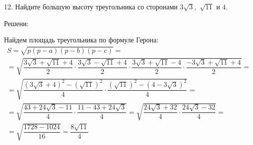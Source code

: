 12. Найдите большую высоту треугольника со сторонами $3\sqrt{3},$ $\sqrt{11}$ и $4$.

Решени:

Найдем площадь треугольника по формуле Герона:
\begin{multline*}
S = \sqrt{p(p-a)(p-b)(p-c)} =\\
=\sqrt{\dfrac{3\sqrt{3}+\sqrt{11}+4}{2}\cdot \dfrac{3\sqrt{3}-\sqrt{11}+4}{2}\cdot \dfrac{3\sqrt{3}+\sqrt{11}-4}{2}\cdot \dfrac{-3\sqrt{3}+\sqrt{11}+4}{2}}=\\
=\sqrt{\dfrac{(3\sqrt{3}+4)^2-(\sqrt{11})^2}{4}\cdot \dfrac{(\sqrt{11})^2-(4-3\sqrt{3})^2}{4}}=\\
=\sqrt{\dfrac{43+24\sqrt{3}-11}{4}\cdot \dfrac{11-43+24\sqrt{3}}{4}} =\sqrt{\dfrac{24\sqrt{3}+32}{4}\cdot \dfrac{24\sqrt{3}-32}{4}} =\\= \sqrt{\dfrac{1728-1024}{16}} = \dfrac{8\sqrt{11}}{4}
\end{multline*}